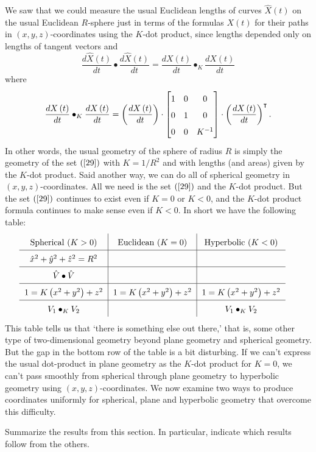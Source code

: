 \documentclass{ximera}
\begin{document}
We saw that we could measure the usual Euclidean lengths of curves $\hat
{X}\left(  t\right)  $ on the usual Euclidean $R$-sphere just in terms of the
formulas $X\left(  t\right)  $ for their paths in $\left(  x,y,z\right)
$-coordinates using the $K$-dot product, since lengths depended only on
lengths of tangent vectors and%
\[
\frac{d\hat{X}\left(  t\right)  }{dt}\bullet\frac{d\hat{X}\left(  t\right)
}{dt}=\frac{dX\left(  t\right)  }{dt}\bullet_{K}\frac{dX\left(  t\right)
}{dt}%
\]
where%
\[
\frac{dX\left(  t\right)  }{dt}\bullet_{K}\frac{dX\left(  t\right)  }%
{dt}=\left(  \frac{dX\left(  t\right)  }{dt}\right)  \cdot\begin{bmatrix}
1 & 0 & 0\\
0 & 1 & 0\\
0 & 0 & K^{-1}%
\end{bmatrix}  \cdot\left(  \frac{dX\left(  t\right)  }{dt}\right)  ^\transpose.
\]
In other words, the usual geometry of the sphere of radius $R$ is simply the
geometry of the set $\left(  \ref{29}\right)  $ with $K=1/R^{2}$ and with
lengths (and areas) given by the $K$-dot product. Said another way, we can do
all of spherical geometry in $\left(  x,y,z\right)  $-coordinates. All we need
is the set $\left(  \ref{29}\right)  $ and the $K$-dot product. But the set
$\left(  \ref{29}\right)  $ continues to exist even if $K=0$ or $K<0$, and the
$K$-dot product formula continues to make sense even if $K<0$. In short we
have the following table:
\begin{equation}%
{\renewcommand{\arraystretch}{1.6}
\begin{tabular}
[c]{c|c|c}%
Spherical ($K>0$) & Euclidean ($K=0$) & Hyperbolic ($K<0$)\\\hline
$\hat{x}^{2}+\hat{y}^{2}+\hat{z}^{2}=R^{2}$ &  & \\\hline
$\hat{V}\bullet\hat{V}$ &  & \\\hline
$1=K\left(  x^{2}+y^{2}\right)  +z^{2}$ & $1=K\left(  x^{2}+y^{2}\right)
+z^{2}$ & $1=K\left(  x^{2}+y^{2}\right)  +z^{2}$\\ \hline
$V_{1}\bullet_{K}V_{2}$ &  & $V_{1}\bullet_{K}V_{2}$%
\end{tabular}}
\ \ \ \ \label{66}%
\end{equation}
This table tells us that `there is something else out there,' that is,
some other type of two-dimensional geometry beyond plane geometry and
spherical geometry. But the gap in the bottom row of the table is a
bit disturbing. If we can't express the usual dot-product in plane
geometry as the $K$-dot product for $K=0$, we can't pass smoothly from
spherical through plane geometry to hyperbolic geometry using $\left(
x,y,z\right) $-coordinates. We now examine two ways to produce
coordinates uniformly for spherical, plane and hyperbolic geometry
that overcome this difficulty.


\begin{problem}
Summarize the results from this section. In particular, indicate which
results follow from the others.
\begin{freeResponse}
\end{freeResponse}
\end{problem}
\end{document}
